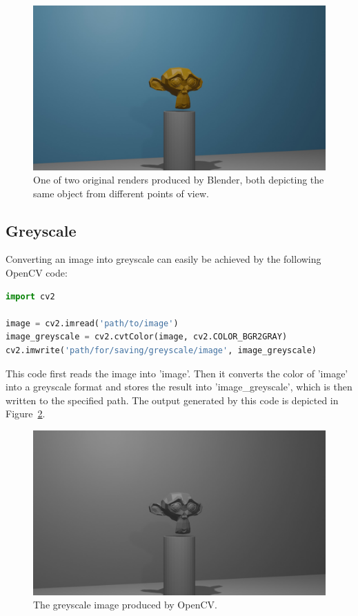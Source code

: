 \begin{figure}[h!]
	\centering
	\includegraphics[width=5in]{img/implementation_opencv_original.png}
	\caption{One of two original renders produced by Blender, both depicting the same object from different points of view.}	%
	\label{pic:implementation_opencv_original}
\end{figure}

\subsection{Greyscale}
Converting an image into greyscale can easily be achieved by the following OpenCV code:

\begin{lstlisting}[language=python]
import cv2

image = cv2.imread('path/to/image')
image_greyscale = cv2.cvtColor(image, cv2.COLOR_BGR2GRAY)
cv2.imwrite('path/for/saving/greyscale/image', image_greyscale)
\end{lstlisting}

This code first reads the image into 'image'. Then it converts the color of 'image' into a greyscale format and stores the result into 'image\_greyscale', which is then written to the specified path. The output generated by this code is depicted in Figure~\ref{pic:implementation_opencv_greyscale}.

\begin{figure}[h!]
	\centering
	\includegraphics[width=5in]{img/implementation_opencv_greyscale.png}
	\caption{The greyscale image produced by OpenCV.}
	\label{pic:implementation_opencv_greyscale}
\end{figure}


